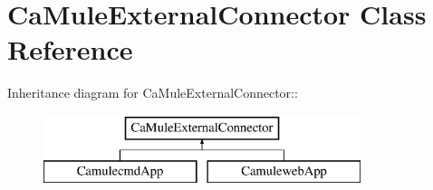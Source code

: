 \section{CaMuleExternalConnector Class Reference}
\label{classCaMuleExternalConnector}
Inheritance diagram for CaMuleExternalConnector::\begin{figure}[H]
\begin{center}
\leavevmode
\includegraphics[height=2cm]{classCaMuleExternalConnector}
\end{center}
\end{figure}
